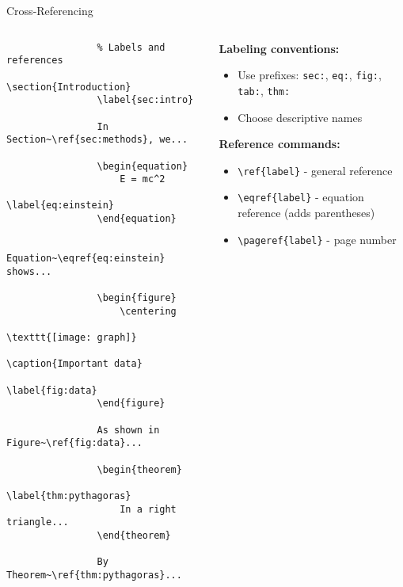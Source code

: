 \begin{frame}[fragile]{Cross-Referencing}
	\begin{columns}
		\begin{column}{0.5\textwidth}
			\begin{lstlisting}
				% Labels and references
				\section{Introduction}
				\label{sec:intro}
				
				In Section~\ref{sec:methods}, we...
				
				\begin{equation}
					E = mc^2
					\label{eq:einstein}
				\end{equation}
				
				Equation~\eqref{eq:einstein} shows...
				
				\begin{figure}
					\centering
					\texttt{[image: graph]}
					\caption{Important data}
					\label{fig:data}
				\end{figure}
				
				As shown in Figure~\ref{fig:data}...
				
				\begin{theorem}
					\label{thm:pythagoras}
					In a right triangle...
				\end{theorem}
				
				By Theorem~\ref{thm:pythagoras}...
			\end{lstlisting}
		\end{column}
		
		\begin{column}{0.5\textwidth}
			\textbf{Labeling conventions:}
			\begin{itemize}
				\item Use prefixes: \texttt{sec:}, \texttt{eq:}, \texttt{fig:}, \texttt{tab:}, \texttt{thm:}
				\item Choose descriptive names
			\end{itemize}
			
			\textbf{Reference commands:}
			\begin{itemize}
				\item \texttt{\textbackslash ref\{label\}} - general reference
				\item \texttt{\textbackslash eqref\{label\}} - equation reference (adds parentheses)
				\item \texttt{\textbackslash pageref\{label\}} - page number
			\end{itemize}
			

\end{column}
\end{columns}
\end{frame}
